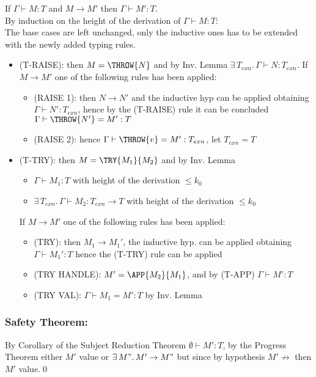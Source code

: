 If $\Gamma \vdash M: T$ and $M \to M'$ then $\Gamma \vdash M': T$.\\
By induction on the height of the derivation of $\Gamma \vdash M: T$:\\
The base cases are left unchanged, only the inductive ones has to be extended with the newly
added typing rules.
\begin{itemize}
	\item (T-RAISE): then $M = \THROW{N}$ and by Inv. Lemma $\exists\, T_{exn}.\, \Gamma \vdash N: T_{exn}$.
	      If $M \to M'$ one of the following rules has been applied:
	      \begin{itemize}
		      \item (RAISE 1): then $N \to N'$ and the inductive hyp can be applied obtaining
		            $\Gamma \vdash N': T_{exn}$, hence by the (T-RAISE) rule it can be concluded
		            $\Gamma \vdash \THROW{N'} = M': T$
		      \item (RAISE 2): hence $\Gamma \vdash \THROW{v} = M': T_{exn}$, let $T_{exn} = T$
	      \end{itemize}
	\item (T-TRY): then $M = \TRY{M_1}{M_2}$ and by Inv. Lemma
	      \begin{itemize}
		      \item $\Gamma \vdash M_1: T$ with height of the derivation $\le k_0$
		      \item $\exists\, T_{exn}.\, \Gamma \vdash M_2: T_{exn} \to T$ with height of the derivation $\le k_0$
	      \end{itemize}
	      If $M \to M'$ one of the following rules has been applied:
	      \begin{itemize}
		      \item (TRY): then $M_1 \to M_1'$, the inductive hyp. can be applied obtaining
		            $\Gamma \vdash M_1': T$ hence the (T-TRY) rule can be applied
		      \item (TRY HANDLE): $M' = \APP{M_2}{M_1}$, and by (T-APP) $\Gamma \vdash M': T$
		      \item (TRY VAL): $\Gamma \vdash M_1 = M': T$ by Inv. Lemma
	      \end{itemize}
\end{itemize}

\subsubsection*{Safety Theorem:}

By Corollary of the Subject Reduction Theorem $\emptyset \vdash M': T$, by the Progress Theorem
either $M'$ value or $\exists\, M".\, M' \to M"$ but since by hypothesis $M' \not\to$ then
$M'$ value.\qed
